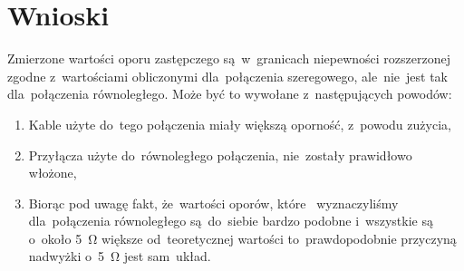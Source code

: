 \documentclass{fizraport}
\begin{document}
\section{Wnioski}
Zmierzone wartości oporu zastępczego są~w~granicach niepewności rozszerzonej zgodne z~wartościami obliczonymi dla~połączenia szeregowego, ale~nie~jest tak dla~połączenia równoległego.
Może być to wywołane z~następujących powodów:
\begin{enumerate}
    \item Kable użyte do~tego połączenia miały większą oporność, z~powodu zużycia,
    \item Przyłącza użyte do~równoległego połączenia, nie~zostały prawidłowo włożone,
    \item Biorąc pod uwagę fakt, że~wartości oporów, które~ wyznaczyliśmy dla~połączenia równoległego są~do~siebie bardzo podobne i~wszystkie są o~około \SI{5}{\ohm} większe od~teoretycznej wartości to~prawdopodobnie przyczyną nadwyżki o~\SI{5}{\ohm} jest sam~układ.
\end{enumerate}
\end{document}
